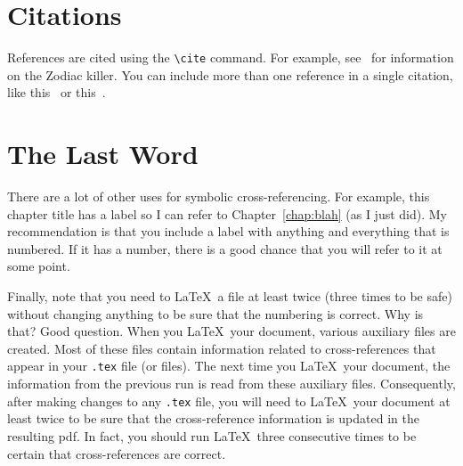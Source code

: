 \section{Citations}

References are cited using the \verb+\cite+ command. For example,
see~\cite{harden} for information on the Zodiac killer. You can include more than one 
reference in a single citation, like this~\cite{harden,bib1,basa,bib3,bib2,glurk,bib7,bib10,bib11}
or this~\cite{bibAC,bib17}.


\section{The Last Word}

There are a lot of other uses for symbolic cross-referencing. For example, this chapter
title has a label so I can refer to Chapter~\ref{chap:blah} (as I just did).
My recommendation is that you include a label with anything and everything that 
is numbered. If it has a number, there is a good chance that you will
refer to it at some point.

Finally, note that you need to \LaTeX\ a file at least twice (three times to
be safe) without changing anything to be sure that the numbering is correct.
Why is that? Good question.
When you \LaTeX\ your document, various auxiliary files are created. Most of these files contain
information related to cross-references that appear in your {\tt .tex} file (or files). The next time you 
\LaTeX\ your document, the information from the previous run is read from
these auxiliary files. Consequently, after making changes to any {\tt .tex}
file, you will need to \LaTeX\ your document at least twice to be sure that the
cross-reference information is updated in the resulting pdf. In fact, you should
run \LaTeX\ three consecutive times to be certain that cross-references are correct.

